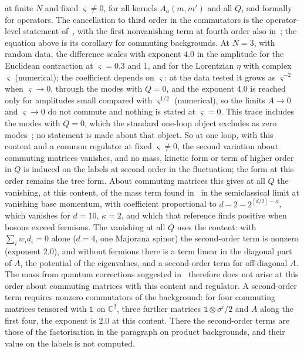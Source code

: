 at finite \(N\) and fixed \(\varsigma\neq0\), for all kernels \(A_a(m,m')\) and all \(Q\), and formally for operators. The cancellation to third order in the commutators is the operator-level statement of~\cite{IKKT1997}, with the first nonvanishing term at fourth order also in~\cite{Steinacker2023}; the equation above is its corollary for commuting backgrounds. At \(N=3\), with random data, the difference scales with exponent \(4.0\) in the amplitude for the Euclidean contraction at \(\varsigma=0.3\) and \(1\), and for the Lorentzian \(\eta\) with complex \(\varsigma\) (numerical); the coefficient depends on \(\varsigma\): at the data tested it grows as \(\varsigma^{-2}\) when \(\varsigma\to0\), through the modes with \(Q=0\), and the exponent \(4.0\) is reached only for amplitudes small compared with \(\varsigma^{1/2}\) (numerical), so the limits \(A\to0\) and \(\varsigma\to0\) do not commute and nothing is stated at \(\varsigma=0\). This trace includes the modes with \(Q=0\), which the standard one-loop object excludes as zero modes~\cite{IKKT1997,AokiIsoKawaiKitazawaTada1998}; no statement is made about that object. So at one loop, with this content and a common regulator at fixed \(\varsigma\neq0\), the second variation about commuting matrices vanishes, and no mass, kinetic form or term of higher order in \(Q\) is induced on the labels at second order in the fluctuation; the form at this order remains the tree form. About commuting matrices this gives at all \(Q\) the vanishing, at this content, of the mass term found in~\cite{Sakai2017} in the semiclassical limit at vanishing base momentum, with coefficient proportional to \(d-2-2^{[d/2]-\kappa}\), which vanishes for \(d=10\), \(\kappa=2\), and which that reference finds positive when bosons exceed fermions. The vanishing at all \(Q\) uses the content: with \(\sum_iw_id_i=0\) alone (\(d=4\), one Majorana spinor) the second-order term is nonzero (exponent \(2.0\)), and without fermions there is a term linear in the diagonal part of \(A\), the potential of the eigenvalues, and a second-order term for off-diagonal \(A\). The mass from quantum corrections suggested in~\cite{FurutaHanadaKawaiKimura2007} therefore does not arise at this order about commuting matrices with this content and regulator. A second-order term requires nonzero commutators of the background: for four commuting matrices tensored with \(\mathbb 1\) on \(\mathbb C^2\), three further matrices \(\mathbb 1\otimes\sigma^i/2\) and \(A\) along the first four, the exponent is \(2.0\) at this content. There the second-order terms are those of the factorisation in the paragraph on product backgrounds, and their value on the labels is not computed.

